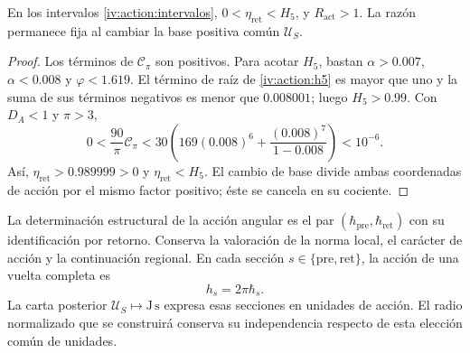 \begin{proposition}
\label{iv:action:positividad}
En los intervalos \eqref{iv:action:intervalos},
\(0<\eta_{\mathrm{ret}}<H_5\), y \(R_{\mathrm{act}}>1\).
La razón permanece fija al cambiar la base positiva común
\(\mathcal U_S\).
\end{proposition}
\begin{proof}
Los términos de \(\mathcal C_\pi\) son positivos. Para acotar
\(H_5\), bastan \(\alpha>0.007\), \(\alpha<0.008\) y
\(\varphi<1.619\). El término de raíz de \eqref{iv:action:h5}
es mayor que uno y la suma de sus términos negativos es menor
que \(0.008001\); luego \(H_5>0.99\).
Con \(D_A<1\) y \(\pi>3\),
\[
 0<\frac{90}{\pi}\mathcal C_\pi
 <30\left(169(0.008)^6+
             \frac{(0.008)^7}{1-0.008}\right)<10^{-6}.
\]
Así, \(\eta_{\mathrm{ret}}>0.989999>0\) y
\(\eta_{\mathrm{ret}}<H_5\). El cambio de base divide ambas
coordenadas de acción por el mismo factor positivo; éste se
cancela en su cociente.
\end{proof}

La determinación estructural de la acción angular es el par
\((\hbar_{\mathrm{pre}},\hbar_{\mathrm{ret}})\) con su
identificación por retorno. Conserva la valoración de la norma
local, el carácter de acción y la continuación regional.
En cada sección \(s\in\{\mathrm{pre},\mathrm{ret}\}\), la acción
de una vuelta completa es
\begin{equation}
 h_s=2\pi\hbar_s.
 \label{iv:action:vuelta}
\end{equation}
La carta posterior \(\mathcal U_S\mapsto\mathrm{J\,s}\) expresa
esas secciones en unidades de acción. El radio normalizado que
se construirá conserva su independencia respecto de esta elección
común de unidades.
